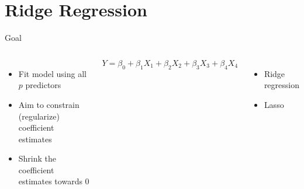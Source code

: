 \documentclass[aspectratio=169,usenames,dvipsnames]{beamer}
\newcommand{\InstructorList}[1]{
\begin{itemize}
	\color{orange}
	#1
\end{itemize}
}
\begin{document}
\section{Ridge Regression}
\begin{frame}[c]{Goal}

\begin{columns}
\centering
\begin{itemize}
	\item Fit model using all $p$ predictors
	\item Aim to constrain (regularize) coefficient estimates
	\item Shrink the coefficient estimates towards 0
\end{itemize}
\centering

\begin{equation*}
	Y = \beta_0 + \beta_1 X_1 + \beta_2 X_2 + \beta_3 X_3 + \beta_4 X_4
\end{equation*}
\InstructorList{
\item Ridge regression
\item Lasso
}
\end{columns}

\end{frame}
\end{document}
